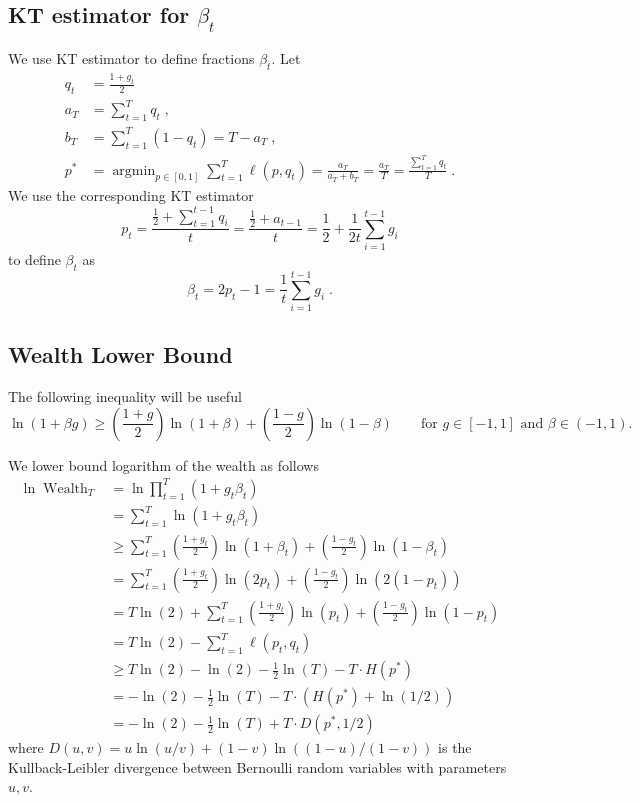 \documentclass{article}
\DeclareMathOperator*{\argmin}{argmin}
\DeclareMathOperator{\Wealth}{Wealth}
\begin{document}
\subsection{KT estimator for $\beta_t$}

We use KT estimator to define fractions $\beta_t$. Let
\begin{align*}
q_t & = \frac{1 + g_t}{2} \\
a_T & = \sum_{t=1}^T q_t \; , \\
b_T & = \sum_{t=1}^T (1 - q_t) = T - a_T \; , \\
p^* & =  \argmin_{p \in [0,1]} \sum_{t=1}^T \ell(p, q_t)
      = \frac{a_T}{a_T + b_T}
      = \frac{a_T}{T} = \frac{\sum_{t=1}^T q_t}{T} \; .
\end{align*}
We use the corresponding KT estimator
$$
p_t = \frac{\frac{1}{2} + \sum_{t=1}^{t-1} q_i}{t} = \frac{\frac{1}{2} + a_{t-1}}{t} = \frac{1}{2} + \frac{1}{2t} \sum_{i=1}^{t-1} g_i
$$
to define $\beta_t$ as
$$
\beta_t = 2p_t - 1 = \frac{1}{t} \sum_{i=1}^{t-1} g_i \; .
$$

\subsection{Wealth Lower Bound}

The following inequality will be useful
$$
\ln\left(1 + \beta g \right) \ge \left( \frac{1+g}{2} \right) \ln \left(1 + \beta\right) + \left( \frac{1-g}{2} \right) \ln \left(1 - \beta \right)
\qquad \text{for $g \in [-1,1]$ and $\beta \in (-1,1)$}.
$$

We lower bound logarithm of the wealth as follows
\allowdisplaybreaks
\begin{align*}
\ln \Wealth_T
& = \ln \prod_{t=1}^T (1 + g_t\beta_t) \\
& =  \sum_{t=1}^T \ln (1 + g_t\beta_t) \\
& \ge  \sum_{t=1}^T \left( \frac{1+g_t}{2} \right) \ln \left(1 + \beta_t\right) + \left( \frac{1-g_t}{2} \right) \ln \left(1 - \beta_t \right) \\
& =  \sum_{t=1}^T \left( \frac{1+g_t}{2} \right) \ln \left(2p_t \right) + \left( \frac{1-g_t}{2} \right) \ln \left(2 (1 - p_t) \right) \\
& =  T \ln(2) + \sum_{t=1}^T \left( \frac{1+g_t}{2} \right) \ln (p_t) + \left( \frac{1-g_t}{2} \right) \ln (1 - p_t) \\
& =  T \ln(2) - \sum_{t=1}^T \ell(p_t, q_t) \\
& \ge  T \ln(2) - \ln(2) - \frac{1}{2} \ln(T) - T \cdot H(p^*) \\
& =  - \ln(2) - \frac{1}{2} \ln(T) - T \cdot (H(p^*) + \ln(1/2)) \\
& =  - \ln(2) - \frac{1}{2} \ln(T) + T \cdot D\left(p^*, 1/2 \right)
\end{align*}
where $D(u,v) = u \ln(u/v) + (1-v) \ln((1-u)/(1-v))$ is the Kullback-Leibler divergence
between Bernoulli random variables with parameters $u,v$.
\end{document}
